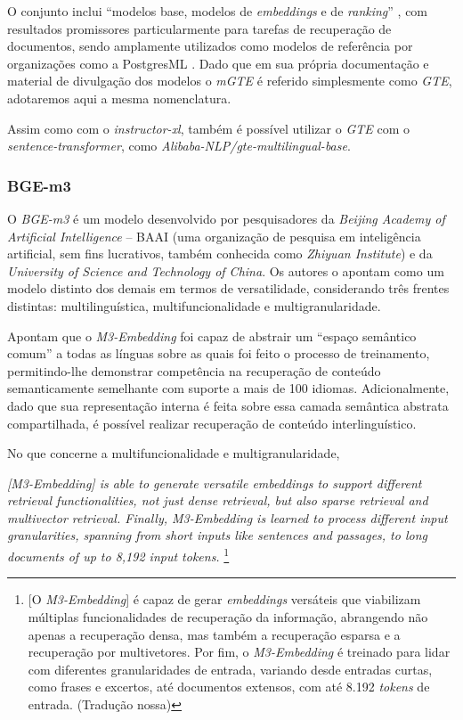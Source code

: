 O conjunto inclui ``modelos base, modelos de \textit{embeddings} e de \textit{ranking}'' \cite{GTE:1}, com resultados promissores particularmente para tarefas de recuperação de documentos, sendo amplamente utilizados como modelos de referência por organizações como a PostgresML \cite{GTE:2}. Dado que em sua própria documentação e material de divulgação dos modelos o \textit{mGTE} é referido simplesmente como \textit{GTE}, adotaremos aqui a mesma nomenclatura.

Assim como com o \textit{instructor-xl}, também é possível utilizar o \textit{GTE} com o \textit{sentence-transformer}, como \textit{Alibaba-NLP/gte-multilingual-base}.

\subsubsection{BGE-m3}
\label{subsubsec:Metodologia.2.1.5}
O \textit{BGE-m3} é um modelo desenvolvido por pesquisadores da \textit{Beijing Academy of Artificial Intelligence} -- BAAI (uma organização de pesquisa em inteligência artificial, sem fins lucrativos, também conhecida como \textit{Zhiyuan Institute}) e da \textit{University of Science and Technology of China}. Os autores o apontam como um modelo distinto dos demais em termos de versatilidade, considerando três frentes distintas: multilinguística, multifuncionalidade e multigranularidade.

Apontam  que o \textit{M3-Embedding} foi capaz de abstrair um ``espaço semântico comum'' a todas as línguas sobre as quais foi feito o processo de treinamento, permitindo-lhe demonstrar competência na recuperação de conteúdo semanticamente semelhante com suporte a mais de 100 idiomas. Adicionalmente, dado que sua representação interna é feita sobre essa camada semântica abstrata compartilhada, é possível realizar recuperação de conteúdo interlinguístico.

No que concerne a multifuncionalidade e multigranularidade,

\begin{citacao}
    \textit{[M3-Embedding] is able to generate versatile embeddings to support different retrieval functionalities, not just dense retrieval, but also sparse retrieval and multivector retrieval. Finally, M3-Embedding is learned to process different input granularities, spanning from short inputs like sentences and passages, to long documents of up to 8,192 input tokens.} \cite{BGE:1}
    \footnote{[O \textit{M3-Embedding}] é capaz de gerar \textit{embeddings} versáteis que viabilizam múltiplas funcionalidades de recuperação da informação, abrangendo não apenas a recuperação densa, mas também a recuperação esparsa e a recuperação por multivetores. Por fim, o \textit{M3-Embedding} é treinado para lidar com diferentes granularidades de entrada, variando desde entradas curtas, como frases e excertos, até documentos extensos, com até 8.192 \textit{tokens} de entrada. (Tradução nossa)}
\end{citacao}


